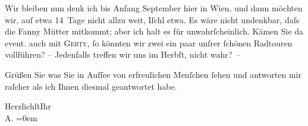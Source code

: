\pstart
           Wir bleiben nun denk ich bis Anfang September hier in Wien, und dann möchten wir, auf etwa 14 Tage nicht allzu weit,
                  Iſchl etwa. Es {\pb}wäre nicht undenkbar, daſs die Fanny Mütter
               mitkommt; aber ich halt es für unwahrſcheinlich. Kämen Sie da{\geminationn} event. auch mit \textsc{Gerty}, ſo könnten wir zwei ein paar unſrer ſchönen Radtouren vollführen? – Jedenfalls
               treffen wir uns im Herbſt, nicht wahr? –\pend
           
\pstart
           Grüßen Sie was Sie in Auſſee von erfreulichen
               Menſchen ſehen und antworten mir raſcher als ich Ihnen diesmal geantwortet habe.\pend
           
\pstart
           Herzlichſt\hspace*{1.5em}Ihr{\\[\baselineskip]}\spacefill\mbox{A.}\pend
           \leftskip=0em{}\endnumbering{}  
      